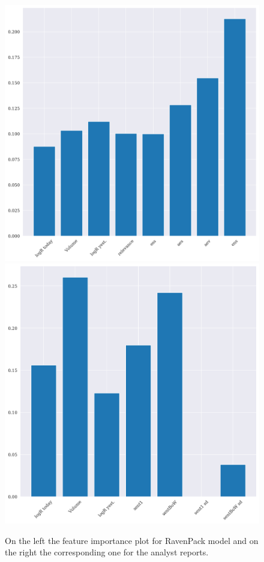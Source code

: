 \begin{figure}[h!]
    \centering
    \begin{adjustbox}{width=.95\textwidth,center}
        \includegraphics[width = \linewidth]{figures/XGBoostRav_tomorrow_iterative.png}
        \includegraphics[width = \linewidth]{figures/XGBoostSent_tomorrow_iterative.png}
    \end{adjustbox}  
    \caption{On the left the feature importance plot for RavenPack model and on the right the corresponding one for the analyst reports.}
    \label{fig:VIP}
\end{figure}



